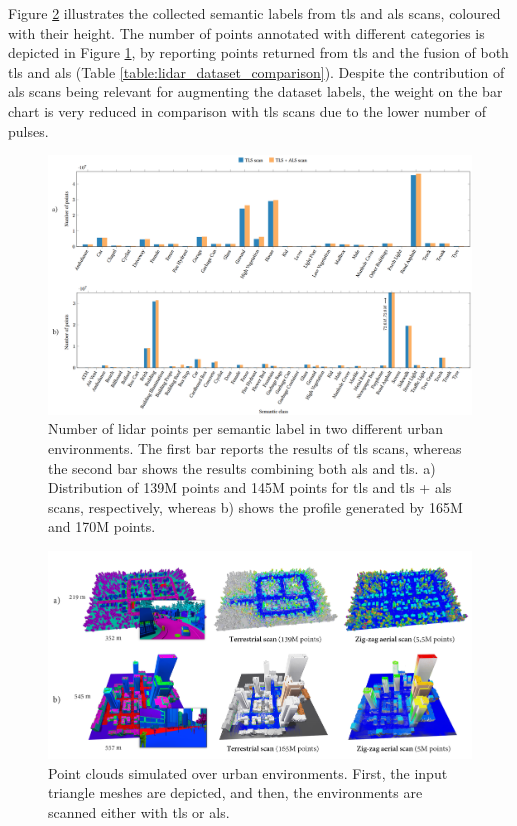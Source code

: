 Figure \ref{fig:lidar_urban_scan} illustrates the collected semantic labels from \acrshort{tls} and \acrshort{als} scans, coloured with their height. The number of points annotated with different categories is depicted in Figure \ref{fig:semantic_histogram}, by reporting points returned from \acrshort{tls} and the fusion of both \acrshort{tls} and \acrshort{als} (Table \ref{table:lidar_dataset_comparison}). Despite the contribution of \acrshort{als} scans being relevant for augmenting the dataset labels, the weight on the bar chart is very reduced in comparison with \acrshort{tls} scans due to the lower number of pulses.

\begin{figure}[ht]
    \centering
    \includegraphics[width=\linewidth]{figs/lidar_simulation/bar_chart_annotations.png}
	\caption{Number of \acrshort{lidar} points per semantic label in two different urban environments. The first bar reports the results of \acrshort{tls} scans, whereas the second bar shows the results combining both \acrshort{als} and \acrshort{tls}. a) Distribution of 139M points and 145M points for \acrshort{tls} and \acrshort{tls} + \acrshort{als} scans, respectively, whereas b) shows the profile generated by 165M and 170M points. }
	\label{fig:semantic_histogram}
\end{figure}

\begin{figure}[ht]
    \centering
    \includegraphics[width=.9\linewidth]{figs/lidar_simulation/urban_scan.png}
	\caption{Point clouds simulated over urban environments. First, the input triangle meshes are depicted, and then, the environments are scanned either with \acrshort{tls} or \acrshort{als}.}
	\label{fig:lidar_urban_scan}
\end{figure}

